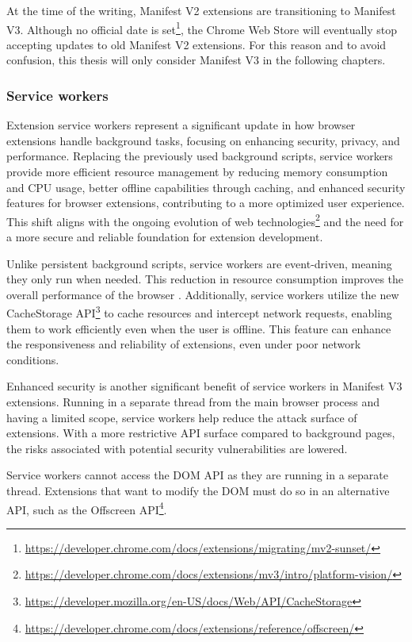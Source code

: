 At the time of the writing, Manifest V2 extensions are transitioning to Manifest V3. Although no official date is set\footnote{\url{https://developer.chrome.com/docs/extensions/migrating/mv2-sunset/}}, the Chrome Web Store will eventually stop accepting updates to old Manifest V2 extensions. For this reason and to avoid confusion, this thesis will only consider Manifest V3 in the following chapters.

\subsubsection{Service workers}

Extension service workers represent a significant update in how browser extensions handle background tasks, focusing on enhancing security, privacy, and performance. Replacing the previously used background scripts, service workers provide more efficient resource management by reducing memory consumption and CPU usage, better offline capabilities through caching, and enhanced security features for browser extensions, contributing to a more optimized user experience. This shift aligns with the ongoing evolution of web technologies\footnote{{\url{https://developer.chrome.com/docs/extensions/mv3/intro/platform-vision/}}} and the need for a more secure and reliable foundation for extension development.

Unlike persistent background scripts, service workers are event-driven, meaning they only run when needed. This reduction in resource consumption improves the overall performance of the browser \cite{ChromeWebExtensions}. Additionally, service workers utilize the new CacheStorage API\footnote{\url{https://developer.mozilla.org/en-US/docs/Web/API/CacheStorage}} to cache resources and intercept network requests, enabling them to work efficiently even when the user is offline. This feature can enhance the responsiveness and reliability of extensions, even under poor network conditions.

Enhanced security is another significant benefit of service workers in Manifest V3 extensions. Running in a separate thread from the main browser process and having a limited scope, service workers help reduce the attack surface of extensions. With a more restrictive API surface compared to background pages, the risks associated with potential security vulnerabilities are lowered.

Service workers cannot access the DOM API as they are running in a separate thread. Extensions that want to modify the DOM must do so in an alternative API, such as the Offscreen API\footnote{\url{https://developer.chrome.com/docs/extensions/reference/offscreen/}}.

